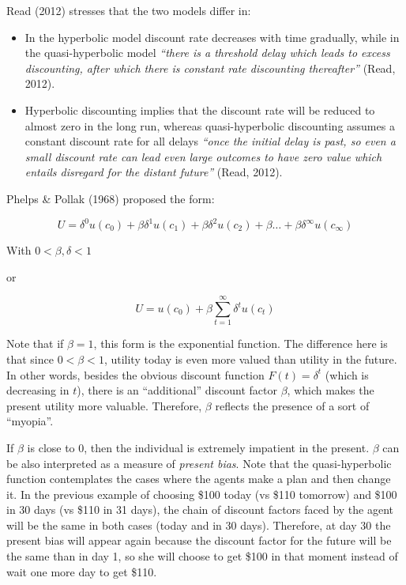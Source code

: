\documentclass[]{article}
\providecommand{\tightlist}{%
  \setlength{\itemsep}{0pt}\setlength{\parskip}{0pt}}
\begin{document}
Read (2012) stresses that the two models differ in:

\begin{itemize}
\tightlist
\item
  In the hyperbolic model discount rate decreases with time gradually, while in the quasi-hyperbolic model \emph{``there is a threshold delay which leads to excess discounting, after which there is constant rate discounting thereafter''} (Read, 2012).
\item
  Hyperbolic discounting implies that the discount rate will be reduced to almost zero in the long run, whereas quasi-hyperbolic discounting assumes a constant discount rate for all delays \emph{``once the initial delay is past, so even a small discount rate can lead even large outcomes to have zero value which entails disregard for the distant future''} (Read, 2012).
\end{itemize}

Phelps \& Pollak (1968) proposed the form:

\[
U = \delta^0 u(c_{0})+ \beta\delta^1 u(c_{1}) + \beta\delta^2 u(c_{2}) + \beta\dots + \beta\delta^\infty u(c_{\infty}) 
\]

With \(0<\beta, \delta <1\)

or

\[
U = u(c_{0})+ \beta \sum_{t=1}^{\infty}\delta^{t} u(c_{t})
\]

Note that if \(\beta=1\), this form is the exponential function. The difference here is that since \(0<\beta<1\), utility today is even more valued than utility in the future. In other words, besides the obvious discount function \(F(t)=\delta^t\) (which is decreasing in \(t\)), there is an ``additional'' discount factor \(\beta\), which makes the present utility more valuable. Therefore, \(\beta\) reflects the presence of a sort of ``myopia''.

If \(\beta\) is close to \(0\), then the individual is extremely impatient in the present. \(\beta\) can be also interpreted as a measure of \emph{present bias}. Note that the quasi-hyperbolic function contemplates the cases where the agents make a plan and then change it. In the previous example of choosing \$100 today (vs \$110 tomorrow) and \$100 in 30 days (vs \$110 in 31 days), the chain of discount factors faced by the agent will be the same in both cases (today and in 30 days). Therefore, at day 30 the present bias will appear again because the discount factor for the future will be the same than in day 1, so she will choose to get \$100 in that moment instead of wait one more day to get \$110.
\end{document}
